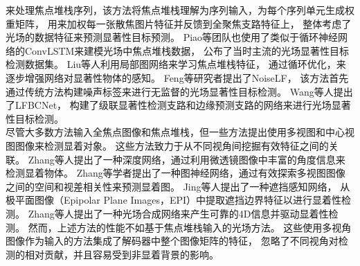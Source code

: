 来处理焦点堆栈序列，该方法将焦点堆栈理解为序列输入，为每个序列单元生成权重矩阵，
用来加权每一张散焦图片特征并反馈到全聚焦支路特征上，
整体考虑了光场的数据特征来预测显著性目标预测。
Piao等团队也使用了类似于循环神经网络的ConvLSTM来建模光场中焦点堆栈数据，
公布了当时主流的光场显著性目标检测数据集。
Liu等人利用局部图网络来学习焦点堆栈特征，
通过循环优化，来逐步增强网络对显著性物体的感知。
Feng等研究者提出了NoiseLF，
该方法首先通过传统方法构建噪声标签来进行无监督的光场显著性目标检测。
Wang等人提出了LFBCNet，
构建了级联显著性检测支路和边缘预测支路的网络来进行光场显著性目标检测。
%
\\
%
%
%
%
\indent
尽管大多数方法输入全焦点图像和焦点堆栈，但一些方法提出使用多视图和中心视图图像来检测显着对象。 
这些方法致力于从不同视角间挖掘有效特征之间的关联。
Zhang等人提出了一种深度网络，通过利用微透镜图像中丰富的角度信息来检测显着物体。 
Zhang等学者提出了一种图神经网络，通过有效探索多视图图像之间的空间和视差相关性来预测显着图。 
Jing等人提出了一种遮挡感知网络，
从极平面图像（Epipolar Plane Images，EPI）中提取遮挡边界特征以进行显着性检测。 
Zhang等人提出了一种光场合成网络来产生可靠的4D信息并驱动显着性检测。 
然而，上述方法的性能不如基于焦点堆栈输入的光场方法。 
这些使用多视角图像作为输入的方法集成了解码器中整个图像矩阵的特征，
忽略了不同视角对检测的相对贡献，并且容易受到非显着背景的影响。 
\\
%
%
%
%
\indent
